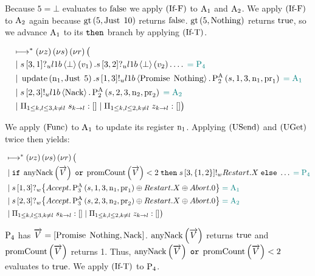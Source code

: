 Because $5 = \bot$ evaluates to $\False$ we apply $\RIfF$ to $\Acceptor{1}$ and $\Acceptor{2}$.
We apply $\RIfF$ to $\Acceptor{2}$ again because $\greaterThan{5}{\Just{10}}$ returns $\False$.
$\greaterThan{5}{\Nothing}$ returns $\True$, so we advance $\Acceptor{1}$ to its $\ThenName$ branch by applying $\RIfT$.

\begin{align*}
&\mapstostar\NuChannels\big (\\
&\Or
    \ReceiveUnreliableP{\ChannelS}{3}{1}{\LOneB}{\bot}{v_1}.
    \ReceiveUnreliableP{\ChannelS}{3}{2}{\LOneB}{\bot}{v_2}.
    \ldots
    \comment{= \Proposer{4}}\\
&\Or
    \update{\NumberRegister_1}{\Just{5}}.
    \SendUnreliableP{\ChannelS}{1}{3}{\LOneB}{\Promise{\Nothing}}.
    \Call{\PaTwo}{\ChannelS, 1, 3, \NumberRegister_1, \ProposalRegister_1}
    \comment{= \Acceptor{1}}\\
&\Or
    \SendUnreliableP{\ChannelS}{2}{3}{\LOneB}{\Nack}.
    \Call{\PaTwo}{\ChannelS, 2, 3, \NumberRegister_2, \ProposalRegister_2}
    \comment{= \Acceptor{2}}\\
&\Or \InnerSessionQueues{\ChannelS}
\Or \OuterSessionQueues
\big )
\end{align*}

We apply $\RSideEffect$ to $\Acceptor{1}$ to update its register $\NumberRegister_1$.
Applying $\RUsend$ and $\RUget$ twice then yields:

\begin{align*}
&\mapstostar\NuChannels\big (\\
&\Or
    \mIf \anyNack{\VectorV} \tOr \promiseCount{\VectorV} < 2
    \;\mThen \mSendWeaklyP{\ChannelS}{3}{\Curly{1, 2}}{\Restart}. \RecursionVariable
    \;\mElse \ldots
    \comment{= \Proposer{4}}\\
&\Or
    \ReceiveWeaklyP{\ChannelS}{1}{3}{
        \Accept. \PaThree{\ChannelS, 1, 3, \NumberRegister_1, \ProposalRegister_1} \oplus \Restart. \RecursionVariable \oplus \Abort . \End
    }
    \comment{= \Acceptor{1}}\\
&\Or
    \ReceiveWeaklyP{\ChannelS}{2}{3}{
        \Accept. \PaThree{\ChannelS, 2, 3, \NumberRegister_2, \ProposalRegister_2} \oplus \Restart. \RecursionVariable \oplus \Abort . \End
    }
    \comment{= \Acceptor{2}}\\
&\Or \InnerSessionQueues{\ChannelS}
\Or \OuterSessionQueues
\big )
\end{align*}

$\Proposer{4}$ has $\VectorV = \Bracket{\Promise{\Nothing}, \Nack}$.
$\anyNack{\VectorV}$ returns $\True$ and $\promiseCount{\VectorV}$ returns 1.
Thus, $\anyNack{\VectorV} \tOr \promiseCount{\VectorV} < 2$ evaluates to $\True$.
We apply $\RIfT$ to $\Proposer{4}$.

